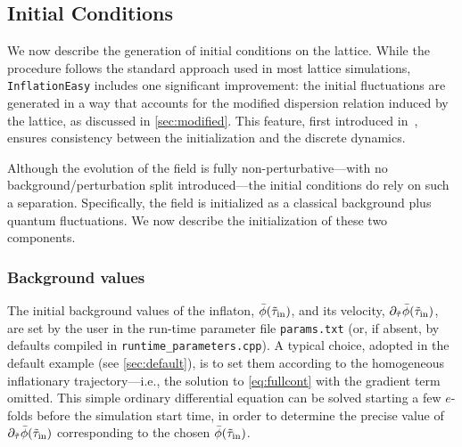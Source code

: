 \documentclass[aps, nofootinbib,superscriptaddress, preprintnumbers, longbibliography]{article}
\begin{document}
	
\subsection{Initial Conditions}
\label{sec:ic}

We now describe the generation of initial conditions on the lattice. While the procedure follows the standard approach used in most lattice simulations, \texttt{InflationEasy} includes one significant improvement: the initial fluctuations are generated in a way that accounts for the modified dispersion relation induced by the lattice, as discussed in \cref{sec:modified}. This feature, first introduced in~\cite{Caravano:2021pgc}, ensures consistency between the initialization and the discrete dynamics.

Although the evolution of the field is fully non-perturbative—with no background/perturbation split introduced—the initial conditions do rely on such a separation. Specifically, the field is initialized as a classical background plus quantum fluctuations. We now describe the initialization of these two components.

\subsubsection{Background values}

The initial background values of the inflaton, $\bar{\phi}(\tilde\tau_{\rm in})$, and its velocity, $\partial_{\tilde\tau} \bar{\phi}(\tilde\tau_{\rm in})$, are set by the user in the run-time parameter file \texttt{params.txt} (or, if absent, by defaults compiled in \texttt{runtime\_parameters.cpp}). A typical choice, adopted in the default example (see \cref{sec:default}), is to set them according to the homogeneous inflationary trajectory—i.e., the solution to \eqref{eq:fullcont} with the gradient term omitted. This simple ordinary differential equation can be solved starting a few $e$-folds before the simulation start time, in order to determine the precise value of $\partial_{\tilde\tau} \bar{\phi}(\tilde\tau_{\rm in})$ corresponding to the chosen $\bar{\phi}(\tilde\tau_{\rm in})$.
\end{document}
